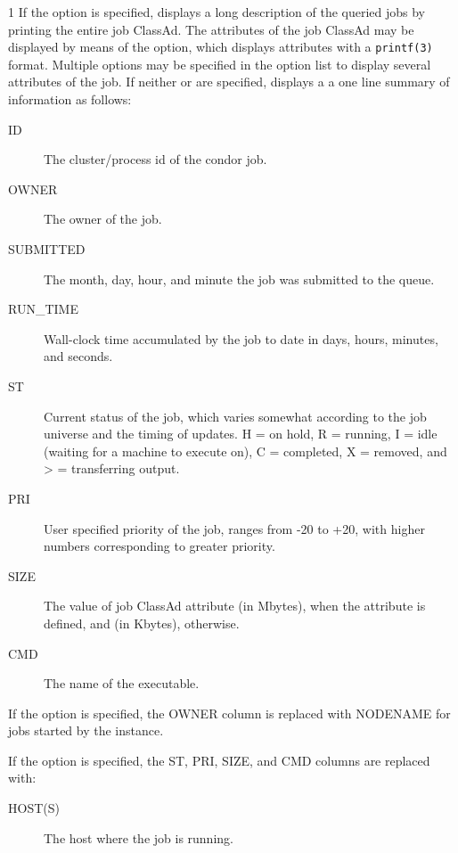 \begin{ManPage}{\label{man-condor-q}}{1}
If the  option is specified,  displays a long description 
of the queried jobs by printing the entire job ClassAd.
The attributes of the job ClassAd may be displayed by means of the
 option, which displays attributes with a \verb+printf(3)+
format.
Multiple  options may be specified in the option list to display
several attributes of the job.
If neither  or  are specified,  displays a 
a one line summary of information as follows:

\begin{description}
\item[ID] The cluster/process id of the condor job. 
\item[OWNER] The owner of the job. 
\item[SUBMITTED] The month, day, hour, and minute the job was submitted to the 
	queue. 
\item[RUN\_TIME]  Wall-clock time accumulated by the job to date in days, 
	hours, minutes, and seconds.  
\item[ST] Current status of the job, which varies somewhat according
        to the job universe and the timing of updates.
        H = on hold,
        R = running,
	I = idle
        (waiting for a machine to execute on), C = completed, 
        X = removed, and
        > = transferring output. 
\item[PRI] User specified priority of the job, ranges from -20 to +20, with 
	higher numbers corresponding to greater priority. 
\item[SIZE] The value of job ClassAd attribute  (in Mbytes),
when the attribute is defined, and  (in Kbytes), otherwise. 
\item[CMD] The name of the executable. 
\end{description}

If the  option is specified, the OWNER column is replaced
with NODENAME for jobs started by the  instance.

If the  option is specified, the ST, PRI, SIZE, and CMD
columns are replaced with:

\begin{description}
\item[HOST(S)] The host where the job is running.
\end{description}


\end{ManPage}
